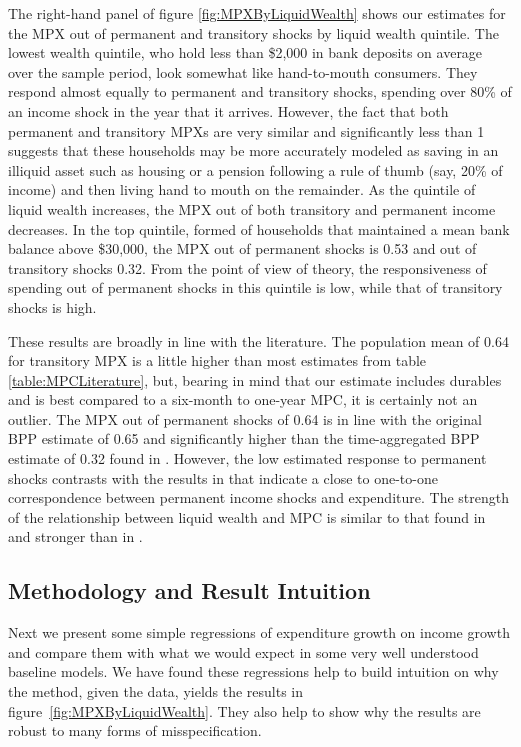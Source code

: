 \documentclass[titlepage]{\econtex}\newcommand{\texname}{ConsumptionHeterogeneity}
\begin{document}
	The right-hand panel of figure \ref{fig:MPXByLiquidWealth} shows our estimates for the MPX out of permanent and transitory shocks by liquid wealth quintile. The lowest wealth quintile, who hold less than \$2,000 in bank deposits on average over the sample period, look somewhat like hand-to-mouth consumers. They respond almost equally to permanent and transitory shocks, spending over 80\% of an income shock in the year that it arrives. However, the fact that both permanent and transitory MPXs are very similar and significantly less than 1 suggests that these households may be more accurately modeled as saving in an illiquid asset such as housing or a pension following a rule of thumb (say, 20\% of income) and then living hand to mouth on the remainder. As the quintile of liquid wealth increases, the MPX out of both transitory and permanent income decreases. In the top quintile, formed of households that maintained a mean bank balance above \$30,000, the MPX out of permanent shocks is 0.53 and out of transitory shocks 0.32. From the point of view of theory, the responsiveness of spending out of permanent shocks in this quintile is low, while that of transitory shocks is high.
	
	These results are broadly in line with the literature. The population mean of 0.64 for transitory MPX is a little higher than most estimates from table \ref{table:MPCLiterature}, but, bearing in mind that our estimate includes durables and is best compared to a six-month to one-year MPC, it is certainly not an outlier. The MPX out of permanent shocks of 0.64 is in line with the original BPP estimate of 0.65 and significantly higher than the time-aggregated BPP estimate of 0.32 found in \cite{crawley_time_2020}. However, the low estimated response to permanent shocks contrasts with the results in \cite{gelman_response_2016} that indicate a close to one-to-one correspondence between permanent income shocks and expenditure. The strength of the relationship between liquid wealth and MPC is similar to that found in \cite{gelman_what_2016} and stronger than in \cite{fagereng_mpc_2016}.
	
	\subsection{Methodology and Result Intuition} \label{method_intuit}
	Next we present some simple regressions of expenditure growth on income growth and compare them with what we would expect in some very well understood baseline models. We have found these regressions help to build intuition on why the method, given the data, yields the results in figure~\ref{fig:MPXByLiquidWealth}. They also help to show why the results are robust to many forms of misspecification.
	
\end{document}
